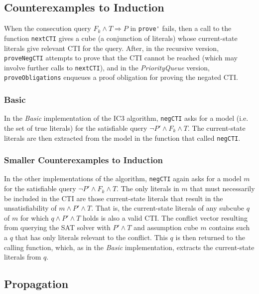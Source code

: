 \documentclass[12pt,a4paper,twoside,openright]{report}
\begin{document}
\begin{lstlisting}
\end{lstlisting}

\subsection{Counterexamples to Induction}

When the consecution query $F_k \wedge T \Rightarrow P$
in \verb,prove', fails, then a call to the function \verb,nextCTI,
gives a cube (a conjunction of literals) whose current-state literals
give relevant CTI for the query. After, in the recursive version,
\verb,proveNegCTI, attempts to prove that the CTI cannot be reached
(which may involve further calls to \verb,nextCTI,), and in
the \emph{PriorityQueue} version, \verb,proveObligations, enqueues
a proof obligation for proving the negated CTI.

\subsubsection{Basic}
In the \emph{Basic} implementation of the IC3 algorithm, \verb,negCTI, asks for a model
(i.e. the set of true literals) for the satisfiable query $\neg P' \wedge F_k \wedge T$.
The current-state literals are then extracted from the model in the function that
called \verb,negCTI,.

\subsubsection{Smaller Counterexamples to Induction}
In the other implementations of the algorithm, \verb,negCTI, again asks for a model $m$
for the satisfiable query $\neg P' \wedge F_k \wedge T$. The only literals in $m$ that
must necessarily be included in the CTI are those current-state literals that result in
the unsatisfiability of $m \wedge P' \wedge T$. That is, the current-state literals of any
subcube $q$ of $m$ for which $q \wedge P' \wedge T$ holds is also a valid CTI.
The conflict vector resulting from querying the SAT solver with $P' \wedge T$ and assumption
cube $m$ contains such a $q$ that has only literals relevant to the conflict. This $q$ is
then returned to the calling function, which, as in the \emph{Basic} implementation, extracts
the current-state literals from $q$.


\subsection{Propagation}
\end{document}
